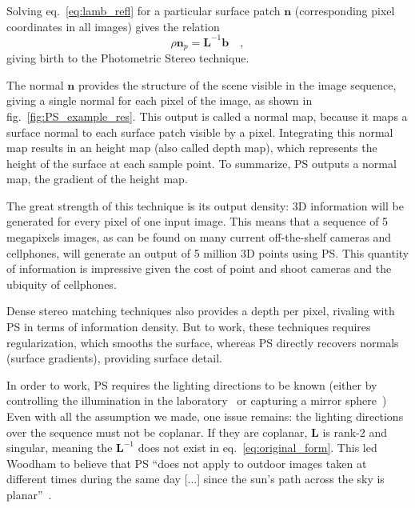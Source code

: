 Solving eq.~\eqref{eq:lamb_refl} for a particular surface patch $\mathbf{n}$ (corresponding pixel coordinates in all images) gives the relation
\begin{equation}
\label{eq:original_form}
\rho \mathbf{n}_p =  \mathbf{L}^{-1} \mathbf{b} \quad,
\end{equation}
giving birth to the Photometric Stereo technique.

The normal $\mathbf{n}$ provides the structure of the scene visible in the image sequence, giving a single normal for each pixel of the image, as shown in fig.~\ref{fig:PS_example_res}. This output is called a normal map, because it maps a surface normal to each surface patch visible by a pixel. Integrating this normal map results in an height map (also called depth map), which represents the height of the surface at each sample point. To summarize, PS outputs a normal map, the gradient of the height map.

The great strength of this technique is its output density: 3D information will be generated for every pixel of one input image. This means that a sequence of 5 megapixels images, as can be found on many current off-the-shelf cameras and cellphones, will generate an output of 5 million 3D points using PS. This quantity of information is impressive given the cost of point and shoot cameras and the ubiquity of cellphones.

Dense stereo matching techniques also provides a depth per pixel, rivaling with PS in terms of information density. But to work, these techniques requires regularization, which smooths the surface, whereas PS directly recovers normals (surface gradients), providing surface detail.

In order to work, PS requires the lighting directions to be known (either by controlling the illumination in the laboratory~\cite{Woodham1979,Ikeuchi1981} or capturing a mirror sphere~\cite{inose-tcva-13,hung-wacv-15,ikehata-cvpr-14,oxholm-eccv-12,ikehata-cvpr-12,shi-cvpr-10,yu-iccp-13,shi-3dv-14}) Even with all the assumption we made, one issue remains: the lighting directions over the sequence must not be coplanar. If they are coplanar, $\mathbf{L}$ is rank-2 and singular, meaning the $\mathbf{L}^{-1}$ does not exist in eq.~\ref{eq:original_form}. This led Woodham to believe that PS ``does not apply to outdoor images taken at different times during the same day [...] since the sun's path across the sky is planar''~\cite{Woodham1979}.


